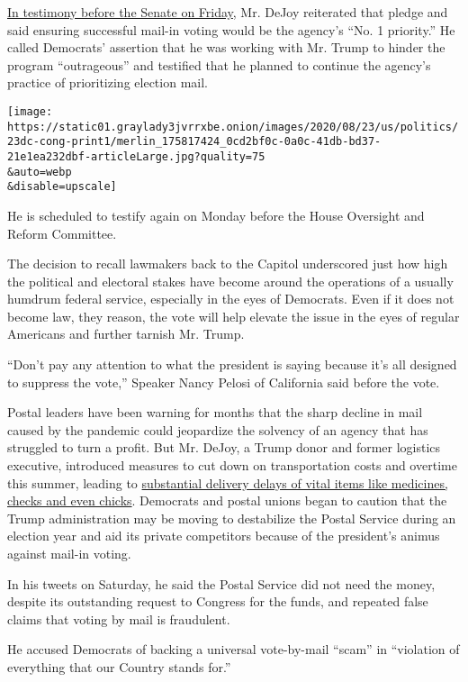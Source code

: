\href{https://www.nytimes3xbfgragh.onion/2020/08/21/us/politics/dejoy-postal-service-senate-hearing.html}{In
testimony before the Senate on Friday}, Mr. DeJoy reiterated that pledge
and said ensuring successful mail-in voting would be the agency's ``No.
1 priority.'' He called Democrats' assertion that he was working with
Mr. Trump to hinder the program ``outrageous'' and testified that he
planned to continue the agency's practice of prioritizing election mail.

\texttt{[image: https://static01.graylady3jvrrxbe.onion/images/2020/08/23/us/politics/23dc-cong-print1/merlin\_175817424\_0cd2bf0c-0a0c-41db-bd37-21e1ea232dbf-articleLarge.jpg?quality=75\\\&auto=webp\\\&disable=upscale]}

He is scheduled to testify again on Monday before the House Oversight
and Reform Committee.

The decision to recall lawmakers back to the Capitol underscored just
how high the political and electoral stakes have become around the
operations of a usually humdrum federal service, especially in the eyes
of Democrats. Even if it does not become law, they reason, the vote will
help elevate the issue in the eyes of regular Americans and further
tarnish Mr. Trump.

``Don't pay any attention to what the president is saying because it's
all designed to suppress the vote,'' Speaker Nancy Pelosi of California
said before the vote.

Postal leaders have been warning for months that the sharp decline in
mail caused by the pandemic could jeopardize the solvency of an agency
that has struggled to turn a profit. But Mr. DeJoy, a Trump donor and
former logistics executive, introduced measures to cut down on
transportation costs and overtime this summer, leading to
\href{https://www.nytimes3xbfgragh.onion/2020/08/21/us/postal-service-mail-rural.html}{substantial
delivery delays of vital items like medicines, checks and even chicks}.
Democrats and postal unions began to caution that the Trump
administration may be moving to destabilize the Postal Service during an
election year and aid its private competitors because of the president's
animus against mail-in voting.

In his tweets on Saturday, he said the Postal Service did not need the
money, despite its outstanding request to Congress for the funds, and
repeated false claims that voting by mail is fraudulent.

He accused Democrats of backing a universal vote-by-mail ``scam'' in
``violation of everything that our Country stands for.''

